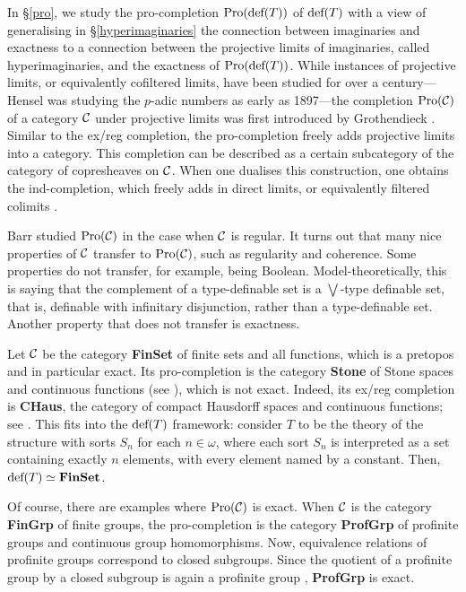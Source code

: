 In \S\ref{pro}, we study the pro-completion $\textup{Pro}(\textup{def}(T))$ of $\textup{def}(T)$ with a view of generalising in \S\ref{hyperimaginaries} the connection between imaginaries and exactness to a connection between the projective limits of imaginaries, called hyperimaginaries, and the exactness of $\textup{Pro}(\textup{def}(T))$. While instances of projective limits, or equivalently cofiltered limits, have been studied for over a century---Hensel was studying the $p$-adic numbers as early as 1897---the completion $\textup{Pro} (\mathcal{C})$ of a category $\mathcal{C}$ under projective limits was first introduced by Grothendieck \cite{Grothendieck1958-1960}. Similar to the ex/reg completion, the pro-completion freely adds projective limits into a category. This completion can be described as a certain subcategory of the category of copresheaves on $\mathcal{C}$. When one dualises this construction, one obtains the ind-completion, which freely adds in direct limits, or equivalently filtered colimits \cite[Expos\'{e} I \S8.10]{a.TheorieToposCohomologie1972}. 

\smallskip

Barr \cite{BARR1986113} studied $\textup{Pro} (\mathcal{C})$ in the case when $\mathcal{C}$ is regular. It turns out that many nice properties of $\mathcal{C}$ transfer to $\textup{Pro}(\mathcal{C})$, such as regularity and coherence. Some properties do not transfer, for example, being Boolean. Model-theoretically, this is saying that the complement of a type-definable set is a $\bigvee$-type definable set, that is, definable with infinitary disjunction, rather than a type-definable set. Another property that does not transfer is exactness. 

\begin{example}\label{finset}
    Let $\mathcal{C}$ be the category \textbf{FinSet} of finite sets and all functions, which is a pretopos and in particular exact. Its pro-completion is the category \textbf{Stone} of Stone spaces and continuous functions (see \cite[Ch.~VI \S 2.3]{alma9912295854401631}), which is not exact. Indeed, its ex/reg completion is \textbf{CHaus}, the category of compact Hausdorff spaces and continuous functions; see \cite[Theorem 8.1]{MarraVincenzo2020Acot}. This fits into the $\textup{def}(T)$ framework: consider $T$ to be the theory of the structure with sorts $S_n$ for each $n\in\omega$, where each sort $S_n$ is interpreted as a set containing exactly $n$ elements, with every element named by a constant. Then, $\textup{def}(T) \simeq \textbf{FinSet}$.
\end{example}

Of course, there are examples where $\textup{Pro}(\mathcal{C})$ is exact. When $\mathcal{C}$ is the category \textbf{FinGrp} of finite groups, the pro-completion is the category \textbf{ProfGrp} of profinite groups and continuous group homomorphisms. Now, equivalence relations of profinite groups correspond to closed subgroups. Since the quotient of a profinite group by a closed subgroup is again a profinite group \cite[Proposition~2.2.1~(a)]{profinite_groups}, \textbf{ProfGrp} is exact.

